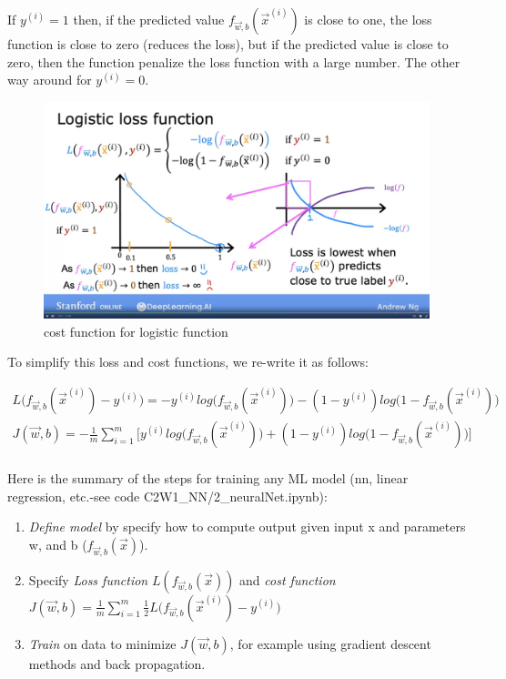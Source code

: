 \documentclass[12pt]{report}
\begin{document}
If $y^{(i)} = 1$ then, if the predicted value $f_{\overrightarrow{w},b} (\overrightarrow{x}^{(i)}) $ is close to one, the loss function is close to zero (reduces the loss), but if the predicted value is close to zero, then the function penalize the loss function with a large number. The other way around for $y^{(i)} = 0$.

\begin{figure}[htbp]
  \begin{center}
    \includegraphics[trim =0cm 6.0cm 0cm 0.0cm, clip, scale=0.15]{pics/logistic2.png}
    \caption{cost function for logistic function}
  \end{center}
\end{figure}

To simplify this loss and cost functions, we re-write it as follows:

\begin{multline}
L\big(f_{\overrightarrow{w},b} (\overrightarrow{x}^{(i)})   - y^{(i)} \big) = - y^{(i)} log\big( f_{\overrightarrow{w},b} (\overrightarrow{x}^{(i)}) \big) - (1-y^{(i)}) log\big(1-f_{\overrightarrow{w},b} (\overrightarrow{x}^{(i)}) \big) \\
J(\overrightarrow{w},b)   = -\frac{1}{m} \sum_{i=1}^{m} \big[ y^{(i)} log\big( f_{\overrightarrow{w},b} (\overrightarrow{x}^{(i)}) \big) + (1-y^{(i)}) log\big(1-f_{\overrightarrow{w},b} (\overrightarrow{x}^{(i)}) \big)  \big] \\
\end{multline}


Here is the summary of the steps for training any ML model (nn, linear regression, etc.-see code C2W1\_NN/2\_neuralNet.ipynb):
\begin{enumerate}
  \item \textit{Define model} by specify how to compute output given input x and parameters w, and b ($f_{\overrightarrow{w},b} (\overrightarrow{x})$).
  \item Specify \textit{Loss function} $L (f_{\overrightarrow{w},b} (\overrightarrow{x}) )  $ and \textit{cost function} $J(\overrightarrow{w},b) = \frac{1}{m} \sum_{i=1}^{m} \frac{1}{2}  L\big(f_{\overrightarrow{w},b} (\overrightarrow{x}^{(i)}) - y^{(i)} \big)$
  \item \textit{Train} on data to minimize $J(\overrightarrow{w},b)$, for example using gradient descent methods and back propagation.
\end{enumerate}
\end{document}
